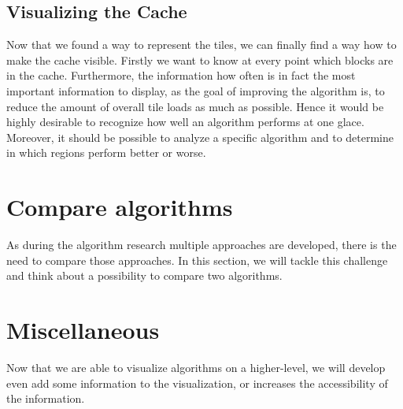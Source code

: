 \documentclass
[
	paper = a4,
    pagesize,
	12 pt,
	oneside,                       %
    open = right,
	DIV = calc,
	BCOR = 0 mm,                   %
	bibtotoc
]
{scrbook}
\begin{document}


\subsection{Visualizing the Cache}

Now that we found a way to represent the tiles, we can finally find a way how to make the cache visible.
Firstly we want to know at every point which blocks are in the cache.
Furthermore, the information how often is in fact the most important information to display, as the goal of improving the algorithm is, to reduce the amount of overall tile loads as much as possible.
Hence it would be highly desirable to recognize how well an algorithm performs at one glace.
Moreover, it should be possible to analyze a specific algorithm and to determine in which regions perform better or worse.



\section{Compare algorithms}

As during the algorithm research multiple approaches are developed, there is the need to compare those approaches.
In this section, we will tackle this challenge and think about a possibility to compare two algorithms.



\section{Miscellaneous}

Now that we are able to visualize algorithms on a higher-level, we will develop even add some information to the visualization, or increases the accessibility of the information.
\end{document}
